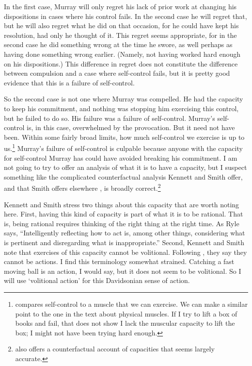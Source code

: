 In the first case, Murray will only regret his lack of prior work at changing his dispositions in cases where his control fails. In the second case he will regret that, but he will also regret what he did on that occasion, for he could have kept his resolution, had only he thought of it. This regret seems appropriate, for in the second case he did something wrong at the time he swore, as well perhaps as having done something wrong earlier. (Namely, not having worked hard enough on his dispositions.) This difference in regret does not constitute the difference between compulsion and a case where self-control fails, but it is pretty good evidence that this is a failure of self-control.

So the second case is not one where Murray was compelled. He had the capacity to keep his commitment, and nothing was stopping him exercising this control, but he failed to do so. His failure was a failure of self-control. Murray's self-control is, in this case, overwhelmed by the provocation. But it need not have been. Within some fairly broad limits, how much self-control we exercise is up to us.\footnote{\citet{Holton2003} compares self-control to a muscle that we can exercise. We can make a similar point to the one in the text about physical muscles. If I try to lift a box of books and fail, that does not show I lack the muscular capacity to lift the box; I might not have been trying hard enough.} Murray's failure of self-control is culpable because anyone with the capacity for self-control Murray has could have avoided breaking his commitment. I am not going to try to offer an analysis of what it is to have a capacity, but I suspect something like the complicated counterfactual analysis Kennett and Smith offer, and that Smith offers elsewhere \citep{Smith1997, Smith2003}, is broadly correct.\footnote{\cite[71ff]{Ryle1949} also offers a counterfactual account of capacities that seems largely accurate.}

Kennett and Smith stress two things about this capacity that are worth noting here. First, having this kind of capacity is part of what it is to be rational. That is, being rational requires thinking of the right thing at the right time. As Ryle says, ``Intelligently reflecting how to act is, among other things, considering what is pertinent and disregarding what is inappropriate.''\cite[31]{Ryle1949} Second, Kennett and Smith note that exercises of this capacity cannot be volitional. Following \citet{Davidson1963}, they say they cannot be actions. I find this terminology somewhat strained. Catching a fast moving ball is an action, I would say, but it does not seem to be volitional. So I will use `volitional action' for this Davidsonian sense of action.

